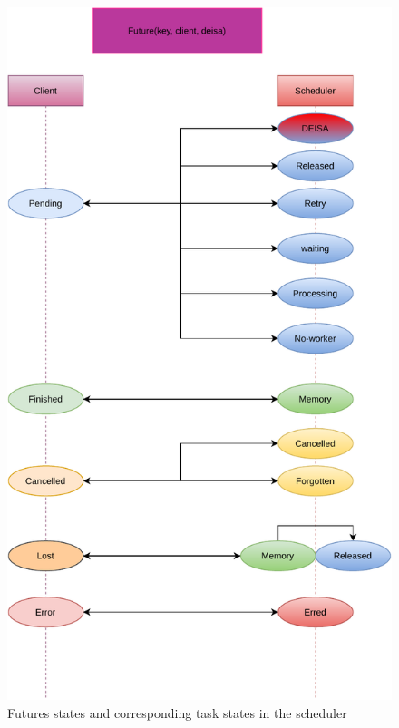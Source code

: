 \begin{figure}[h!]\centering
\includegraphics[scale=0.5]{figures/FutureStateClient.pdf}
\caption{Futures states and corresponding task states in the scheduler}
\label{figfuturestate}
\end{figure}

